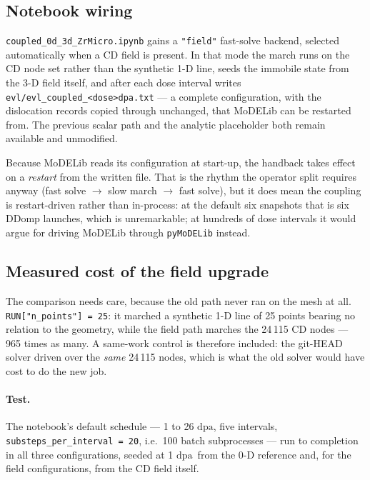 \documentclass[11pt,a4paper]{article}
\newcommand{\code}[1]{\texttt{\small #1}}
\newcommand{\dpa}{\ensuremath{\mathrm{dpa}}}
\begin{document}
\subsection{Notebook wiring}

\code{coupled\_0d\_3d\_ZrMicro.ipynb} gains a \code{"field"} fast-solve backend,
selected automatically when a CD field is present. In that mode the march runs
on the CD node set rather than the synthetic 1-D line, seeds the immobile state
from the 3-D field itself, and after each dose interval writes
\code{evl/evl\_coupled\_<dose>dpa.txt} --- a complete configuration, with the
dislocation records copied through unchanged, that MoDELib can be restarted
from. The previous scalar path and the analytic placeholder both remain
available and unmodified.

Because MoDELib reads its configuration at start-up, the handback takes effect
on a \emph{restart} from the written file. That is the rhythm the operator split
requires anyway (fast solve $\to$ slow march $\to$ fast solve), but it does mean
the coupling is restart-driven rather than in-process: at the default six
snapshots that is six DDomp launches, which is unremarkable; at hundreds of dose
intervals it would argue for driving MoDELib through \code{pyMoDELib} instead.

\subsection{Measured cost of the field upgrade}
\label{sec:fieldcost}

The comparison needs care, because the old path never ran on the mesh at all.
\code{RUN["n\_points"] = 25}: it marched a synthetic 1-D line of 25 points bearing
no relation to the geometry, while the field path marches the 24\,115 CD nodes
--- 965 times as many. A same-work control is therefore included: the git-HEAD
solver driven over the \emph{same} 24\,115 nodes, which is what the old solver
would have cost to do the new job.

\paragraph{Test.} The notebook's default schedule --- 1 to 26 \dpa, five
intervals, \code{substeps\_per\_interval = 20}, i.e.\ 100 batch subprocesses ---
run to completion in all three configurations, seeded at 1 \dpa\ from the 0-D
reference and, for the field configurations, from the CD field itself.
\end{document}
